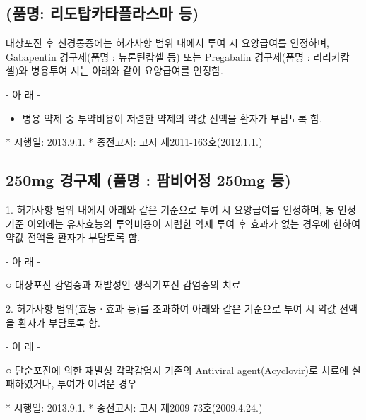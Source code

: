 \subsection{\label{Lidocainpathy}(품명: 리도탑카타플라스마 등)}
대상포진 후 신경통증에는 허가사항 범위 내에서 투여 시 요양급여를 인정하며, Gabapentin 경구제(품명 : 뉴론틴캅셀 등) 또는 Pregabalin 경구제(품명 : 리리카캅셀)와 병용투여 시는 아래와 같이 요양급여를 인정함. \par
- 아 래 -
\begin{itemize}[○]\tightlist
\item 병용 약제 중 투약비용이 저렴한 약제의 약값 전액을 환자가 부담토록 함.
\end{itemize}  
* 시행일: 2013.9.1.
* 종전고시: 고시 제2011-163호(2012.1.1.)

\subsection{\label{FamciclovirOral} 250mg 경구제 (품명 : 팜비어정 250mg 등)}
1. 허가사항 범위 내에서 아래와 같은 기준으로 투여 시 요양급여를 인정하며, 동 인정기준 이외에는 유사효능의 투약비용이 저렴한 약제 투여 후 효과가 없는 경우에 한하여 약값 전액을 환자가 부담토록 함.\par
- 아 래 -\par
○ 대상포진 감염증과 재발성인 생식기포진 감염증의 치료\par
2. 허가사항 범위(효능ㆍ효과 등)를 초과하여 아래와 같은 기준으로 투여 시 약값 전액을 환자가 부담토록 함.\par
- 아 래 -\par
○ 단순포진에 의한 재발성 각막감염시 기존의 Antiviral agent(Acyclovir)로 치료에 실패하였거나, 투여가 어려운 경우\par
* 시행일: 2013.9.1.
* 종전고시: 고시 제2009-73호(2009.4.24.)

